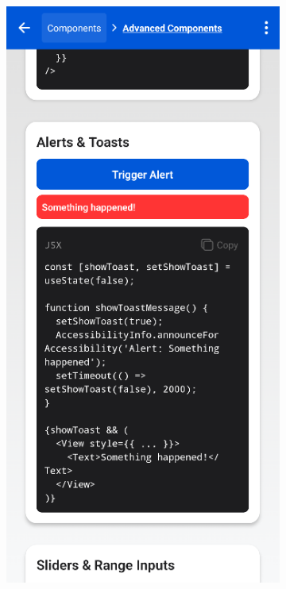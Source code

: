 \begin{figure}[ht]
    \centering
    \begin{subfigure}[b]{0.48\textwidth}
        \centering
        \includegraphics[width=\linewidth, alt={Third part of the Advanced Screen}]{img/advanced3.png}

\end{subfigure}
\end{figure}
